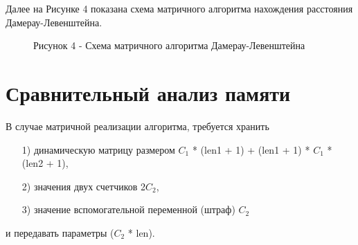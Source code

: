 \documentclass[12pt]{report}
\begin{document}
\newpage
Далее на Рисунке 4 показана схема матричного алгоритма нахождения расстояния Дамерау-Левенштейна.
\begin{figure}[h!]
	\caption*{Рисунок 4 - Схема матричного алгоритма Дамерау-Левенштейна}
\end{figure}

\section{Сравнительный анализ памяти}
В случае матричной реализации алгоритма, требуется хранить
\begin{enumerate}
	\item[1)] динамическую матрицу размером $C_1$ * (len1 + 1) + (len1 + 1) * $C_1$ * (len2 + 1),
	\item[2)] значения двух счетчиков 2$C_2$,
	\item[3)] значение вспомогательной переменной (штраф) $C_2$
\end{enumerate}
и передавать параметры ($C_2$ * len).
\end{document}
